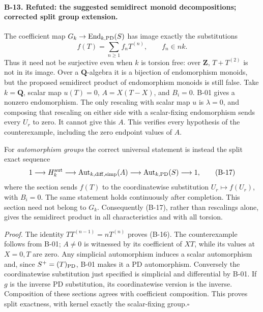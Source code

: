 \paragraph{B-13. Refuted: the suggested semidirect monoid
decompositions; corrected split group extension.}
The coefficient map $G_k\to\operatorname{End}_{k,\rm PD}(S)$ has
image exactly the substitutions
\[
 f(T)=\sum_{n\geq1}f_nT^{(n)},\qquad f_n\in n k.
 \tag{B-16}
\]
Thus it need not be surjective even when $k$ is torsion free:
over $\mathbf Z$, $T+T^{(2)}$ is not in its image. Over a
$\mathbf Q$-algebra it is a bijection of endomorphism monoids,
but the proposed semidirect product of endomorphism monoids is
still false. Take $k=\mathbf Q$, scalar map $u(T)=0$, $A=X(T-X)$,
and $B_i=0$. B-01 gives a nonzero endomorphism. The only rescaling
with scalar map $u$ is $\lambda=0$, and composing that rescaling
on either side with a scalar-fixing endomorphism sends every
$U_r$ to zero. It cannot give this $A$. This verifies every
hypothesis of the counterexample, including the zero endpoint
values of $A$.

For \emph{automorphism groups} the correct universal statement is
instead the split exact sequence
\[
 1\longrightarrow H_k^{\rm aut}\longrightarrow
 \operatorname{Aut}_{k,\rm diff,simp}(A)
 \longrightarrow\operatorname{Aut}_{k,\rm PD}(S)
 \longrightarrow1,
 \tag{B-17}
\]
where the section sends $f(T)$ to the coordinatewise substitution
$U_r\mapsto f(U_r)$, with $B_i=0$. The same statement holds
continuously after completion. This section need not belong to
$G_k$. Consequently (B-17), rather than rescalings alone, gives
the semidirect product in all characteristics and with all torsion.

\emph{Proof.}
The identity $T T^{(n-1)}=nT^{(n)}$ proves (B-16).
The counterexample follows from B-01; $A\ne0$ is witnessed by its
coefficient of $XT$, while its values at $X=0,T$ are zero.
Any simplicial automorphism induces a scalar automorphism and,
since $S^+=(T)_{\rm PD}$, B-01 makes it a PD automorphism.
Conversely the coordinatewise substitution just specified is
simplicial and differential by B-01. If $g$ is the inverse PD
substitution, its coordinatewise version is the inverse.
Composition of these sections agrees with coefficient
composition. This proves split exactness, with kernel exactly
the scalar-fixing group.\hfill$\square$
